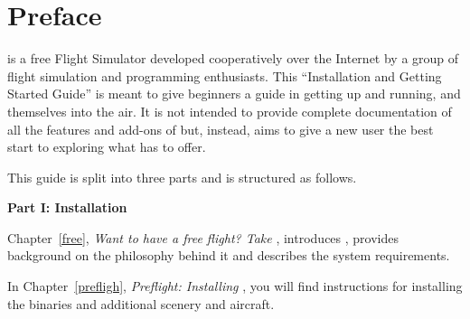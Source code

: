 
\chapter*{Preface\label{preface}}

\FlightGear{} is a free Flight Simulator developed cooperatively over the Internet 
by a group of flight simulation and programming enthusiasts. This ``Installation and Getting
Started Guide'' is meant to give beginners a guide in getting \FlightGear{} up and running, and themselves into the air. It is not intended to provide complete documentation of all the features and add-ons of \FlightGear{} but, instead, aims to give a new user the best start to exploring what \FlightGear{} has to offer.  

This guide is split into three parts and is structured as follows.

\medskip

\noindent
\textbf{Part I: Installation}
\medskip

 \noindent
Chapter~\ref{free}, \textit{Want to have a free flight? Take \FlightGear{}}, introduces
\FlightGear{}, provides background on the philosophy behind it and describes the system requirements.
 \medskip

 \noindent
In Chapter~\ref{prefligh}, \textit{Preflight: Installing \FlightGear{}}, you will find
instructions for installing the binaries and additional scenery and aircraft. 
 \medskip

